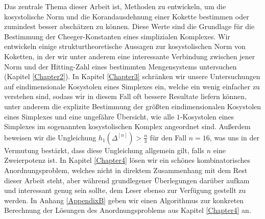 \documentclass[11pt,english,onehalfspacing,headsepline]{MastersDoctoralThesis}
\begin{document}

\begin{Zusammenfassung}
Das zentrale Thema dieser Arbeit ist, Methoden zu entwickeln, um die kosystolische Norm und die Korandausdehnung einer Kokette bestimmen oder zumindest besser abschätzen zu können. Diese Werte sind die Grundlage für die Bestimmung der Cheeger-Konstanten eines simplizialen Komplexes. Wir entwickeln einige strukturtheoretische Aussagen zur kosystolischen Norm von Koketten, in der wir unter anderem eine interessante Verbindung zwischen jener Norm und der Hitting-Zahl eines bestimmten Mengensystems untersuchen (Kapitel \ref{Chapter2}). In Kapitel \ref{Chapter3} schränken wir unsere Untersuchungen auf eindimensionale Kosystolen eines Simplexes ein, welche ein wenig einfacher zu verstehen sind, sodass wir in diesem Fall oft bessere Resultate liefern können, unter anderem die explizite Bestimmung der größten eindimensionalen Kosystolen eines Simplexes und eine ungefähre Übersicht, wie alle \(1\)-Kosystolen eines Simplexes im sogenannten kosystolischen Komplex angeordnet sind. Außerdem beweisen wir die Ungleichung \(h_1(\Delta^{[n]})>\frac{n}{3}\) für den Fall \(n=16\), was uns in der Vermutung bestärkt, dass diese Ungleichung allgemein gilt, falls \(n\) eine Zweierpotenz ist. In Kapitel \ref{Chapter4} lösen wir ein schönes kombinatorisches Anordnungsproblem, welches nicht in direktem Zusammenhang mit dem Rest dieser Arbeit steht, aber während grundlegener Überlegungen darüber aufkam und interessant genug sein sollte, dem Leser ebenso zur Verfügung gestellt zu werden. In Anhang \ref{AppendixB} geben wir einen Algorithmus zur konkreten Berechnung der Lösungen des Anordnungsproblems aus Kapitel \ref{Chapter4} an.
\end{Zusammenfassung}

\end{document}
